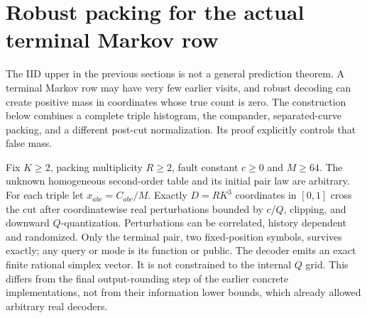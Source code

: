 \documentclass[11pt,letterpaper]{article}
\theoremstyle{definition}\newtheorem{definition}[theorem]{Definition}
\theoremstyle{remark}\newtheorem{remark}[theorem]{Remark}
\begin{document}
\section{Robust packing for the actual terminal Markov row}\label{sec:robustmarkov}
The IID upper in the previous sections is not a general prediction theorem. A terminal Markov row may have very few earlier visits, and robust decoding can create positive mass in coordinates whose true count is zero. The construction below combines a complete triple histogram, the compander, separated-curve packing, and a different post-cut normalization. Its proof explicitly controls that false mass.

Fix $K\ge2$, packing multiplicity $R\ge2$, fault constant $c\ge0$ and $M\ge64$. The unknown homogeneous second-order table and its initial pair law are arbitrary. For each triple let $x_{abc}=C_{abc}/M$. Exactly $D=RK^3$ coordinates in $[0,1]$ cross the cut after coordinatewise real perturbations bounded by $c/Q$, clipping, and downward $Q$-quantization. Perturbations can be correlated, history dependent and randomized. Only the terminal pair, two fixed-position symbols, survives exactly; any query or mode is its function or public. The decoder emits an exact finite rational simplex vector. It is not constrained to the internal $Q$ grid. This differs from the final output-rounding step of the earlier concrete implementations, not from their information lower bounds, which already allowed arbitrary real decoders.
\end{document}
